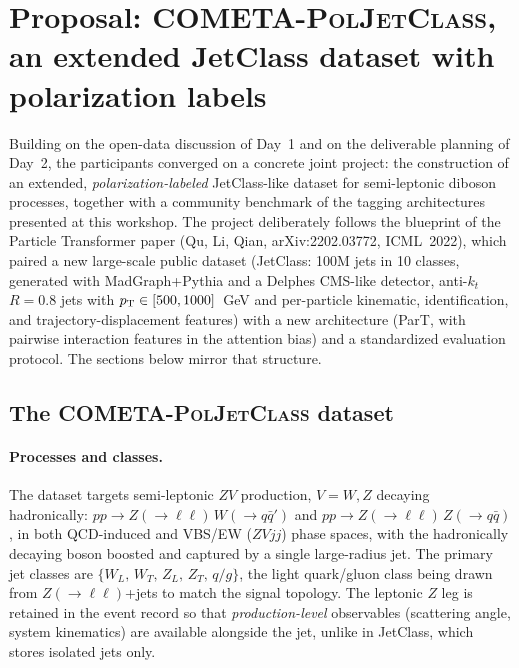 \section{Proposal: \textsc{COMETA-PolJetClass}, an extended JetClass dataset with polarization labels}
\label{sec:proposal}

Building on the open-data discussion of Day~1 and on the deliverable planning
of Day~2, the participants converged on a concrete joint project: the
construction of an extended, \emph{polarization-labeled} JetClass-like dataset
for semi-leptonic diboson processes, together with a community benchmark of the
tagging architectures presented at this workshop. The project deliberately
follows the blueprint of the Particle Transformer paper
(Qu, Li, Qian, arXiv:2202.03772, ICML~2022), which paired a new large-scale
public dataset (JetClass: 100M jets in 10 classes, generated with
MadGraph+Pythia and a Delphes CMS-like detector, anti-$k_t$ $R=0.8$ jets with
$p_{\mathrm{T}}\in[500,1000]$~GeV and per-particle kinematic, identification, and
trajectory-displacement features) with a new architecture (ParT, with pairwise
interaction features in the attention bias) and a standardized evaluation
protocol. The sections below mirror that structure.

\subsection{The \textsc{COMETA-PolJetClass} dataset}

\paragraph{Processes and classes.} The dataset targets semi-leptonic $ZV$
production, $V=W,Z$ decaying hadronically: $pp\to Z(\to\ell\ell)\,W(\to q\bar
q')$ and $pp\to Z(\to\ell\ell)\,Z(\to q\bar q)$, in both QCD-induced and
VBS/EW ($ZVjj$) phase spaces, with the hadronically decaying boson boosted and
captured by a single large-radius jet. The primary jet classes are
$\{W_L,\,W_T,\,Z_L,\,Z_T,\,q/g\}$, the light quark/gluon class being drawn from
$Z(\to\ell\ell)$+jets to match the signal topology. The leptonic $Z$ leg is
retained in the event record so that \emph{production-level} observables
(scattering angle, system kinematics) are available alongside the jet, unlike
in JetClass, which stores isolated jets only.

